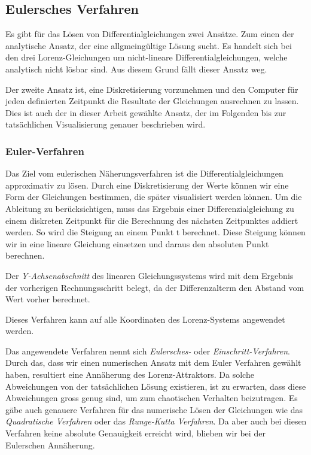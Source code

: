 \subsection{Eulersches Verfahren}
Es gibt für das Lösen von Differentialgleichungen zwei Ansätze. Zum einen der analytische Ansatz, der eine allgmeingültige Lösung sucht. Es handelt sich bei den drei Lorenz-Gleichungen um nicht-lineare Differentialgleichungen, welche analytisch nicht lösbar sind. Aus diesem Grund fällt dieser Ansatz weg. 

Der zweite Ansatz ist, eine Diskretisierung vorzunehmen und den Computer für jeden definierten Zeitpunkt die Resultate der Gleichungen ausrechnen zu lassen. Dies ist auch der in dieser Arbeit gewählte Ansatz, der im Folgenden bis zur tatsächlichen Visualisierung genauer beschrieben wird. 

\subsubsection{Euler-Verfahren}

Das Ziel vom eulerischen Näherungsverfahren ist die Differentialgleichungen approximativ zu lösen. Durch eine Diskretisierung der Werte können wir eine Form der Gleichungen bestimmen, die später visualisiert werden können. Um die Ableitung zu berücksichtigen, muss das Ergebnis einer Differenzialgleichung zu einem diskreten Zeitpunkt für die Berechnung des nächsten Zeitpunktes addiert werden. So wird die Steigung an einem Punkt t berechnet. Diese Steigung können wir in eine lineare Gleichung einsetzen und daraus den absoluten Punkt berechnen.

Der \textit{Y-Achsenabschnitt} des linearen Gleichungssystems wird mit dem Ergebnis der vorherigen Rechnungsschritt belegt, da der Differenzalterm den Abstand vom Wert vorher berechnet.

Dieses Verfahren kann auf alle Koordinaten des Lorenz-Systems angewendet werden.

Das angewendete Verfahren nennt sich \textit{Eulersches-} oder \textit{Einschritt-Verfahren}. Durch das, dass wir einen numerischen Ansatz mit dem Euler Verfahren gewählt haben, resultiert eine Annäherung des Lorenz-Attraktors. Da solche Abweichungen von der tatsächlichen Lösung existieren, ist zu erwarten, dass diese Abweichungen gross genug sind, um zum chaotischen Verhalten beizutragen. Es gäbe auch genauere Verfahren für das numerische Lösen der Gleichungen wie das \textit{Quadratische Verfahren} oder das \textit{Runge-Kutta Verfahren}. Da aber auch bei diesen Verfahren keine absolute Genauigkeit erreicht wird, blieben wir bei der Eulerschen Annäherung. 

